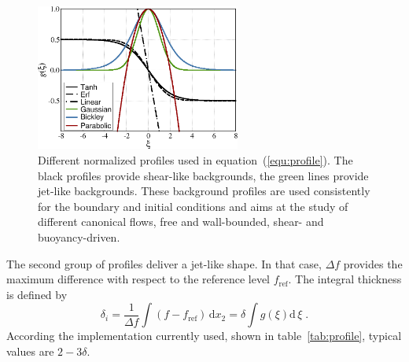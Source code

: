 \begin{figure}
\includegraphics[clip,width=0.6\textwidth]{figs/Profiles.png}
\caption{Different normalized profiles used in equation~(\ref{equ:profile}). The
  black profiles provide shear-like backgrounds, the green lines provide
  jet-like backgrounds. These background profiles are used consistently for the
  boundary and initial conditions and aims at the study of different canonical
  flows, free and wall-bounded, shear- and buoyancy-driven.}\label{fig:profile}
\end{figure}

The second group of profiles deliver a jet-like shape. In that case, $\Delta f$
provides the maximum difference with respect to the reference level
$f_\text{ref}$. The integral thickness is defined by
\begin{equation}
  \delta_i =\frac{1}{\Delta f}\int\! (f-f_\text{ref})\,\mathrm{d} x_2 
  = \delta\int\! g(\xi)\mathrm{d}\,\xi \;.
\label{equ:deltai}
\end{equation}
According the implementation currently used, shown in table~\ref{tab:profile},
typical values are $2-3\delta$.

